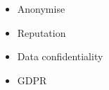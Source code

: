 \begin{notes}

    \begin{itemize}
        \item Anonymise
        \item Reputation
        \item Data confidentiality
        \item GDPR
    \end{itemize}

\end{notes}